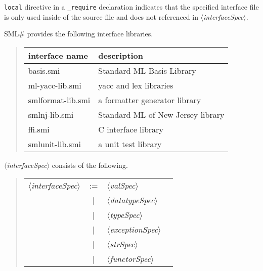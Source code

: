 \documentclass{jbook}
\newcommand{\smlsharp}{SML\#}
\newcommand{\vbar}{\mbox{\ $|$\ }}
\newcommand{\nonterm}[1]{\mbox{$\langle$}{\it #1}\mbox{$\rangle$}}
\newcommand{\term}[1]{\mbox{{\tt #1}}}
\begin{document}
	\term{local} directive in a \term{\_require} declaration
indicates that the specified interface file is only used inside of the
source file and does not referenced in  \nonterm{interfaceSpec}.

	\smlsharp{} provides the following interface libraries.

\begin{quote}
\begin{tabular}{|l|l|}
\hline
interface name & description
\\\hline
\hline
basis.smi & Standard ML Basis Library\\
ml-yacc-lib.smi & yacc and lex libraries \\
smlformat-lib.smi & a formatter generator library \\
smlnj-lib.smi & Standard ML of New Jersey library\\
ffi.smi & C interface library\\
smlunit-lib.smi & a unit test library
\\\hline
\end{tabular}
\end{quote}

	\nonterm{interfaceSpec} consists of the following.

\begin{quote}
\begin{tabular}[t]{lcll}
\nonterm{interfaceSpec} &:=& \nonterm{valSpec}
\\&\vbar& \nonterm{datatypeSpec}
\\&\vbar& \nonterm{typeSpec}
\\&\vbar& \nonterm{exceptionSpec}
\\&\vbar& \nonterm{strSpec}
\\&\vbar& \nonterm{functorSpec}
\end{tabular}
\end{quote}
	
\end{document}
